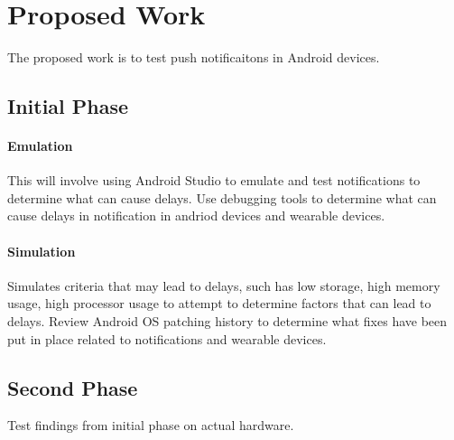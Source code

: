 \section{Proposed Work}
The proposed work is to test push notificaitons in Android devices. 
\subsection{Initial Phase}
\paragraph{Emulation}
This will involve using Android Studio to emulate and test notifications to determine what can cause delays.
Use debugging tools to determine what can cause delays in notification in andriod devices and wearable devices.
\paragraph{Simulation}
Simulates criteria that may lead to delays, such has low storage, high memory usage, high processor usage to attempt to determine factors that can lead to delays.
Review Android OS patching history to determine what fixes have been put in place related to notifications and wearable devices.
\subsection{Second Phase}
Test findings from initial phase on actual hardware.